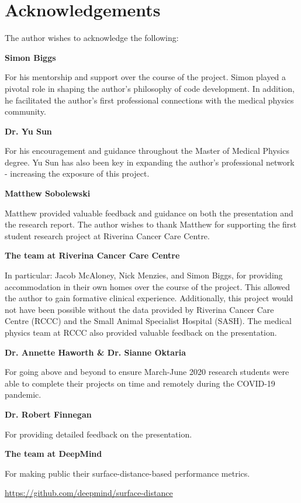 \chapter{Acknowledgements}
\label{ch:acknowledgements}

The author wishes to acknowledge the following:

\textbf{Simon Biggs}

For his mentorship and support over the course of the project. Simon played a pivotal role
in shaping the author's philosophy of code development. In addition, he facilitated the
author's first professional connections with the medical physics community.

\textbf{Dr. Yu Sun}

For his encouragement and guidance throughout the Master of Medical Physics degree. Yu Sun has also been key in expanding the author's professional network - increasing the exposure of this project.

\textbf{Matthew Sobolewski}

Matthew provided valuable feedback and guidance on both the presentation and the research report. The author wishes to thank Matthew for supporting the first student research project at Riverina Cancer Care Centre.

\textbf{The team at Riverina Cancer Care Centre}

In particular: Jacob McAloney, Nick Menzies, and
Simon Biggs, for providing accommodation in their own homes over the course of
the project. This allowed the author to gain formative clinical experience. Additionally, this project would not have been possible without the data provided by Riverina Cancer Care Centre (RCCC) and the Small Animal Specialist Hospital (SASH). The medical physics team at RCCC also provided valuable feedback on the presentation.


\textbf{Dr. Annette Haworth \& Dr. Sianne Oktaria}

For going above and beyond to ensure March-\todo{--}June 2020 research students were able to complete their projects on time and remotely during the COVID-19 pandemic.

\textbf{Dr. Robert Finnegan}

For providing detailed feedback on the presentation.

\textbf{The team at DeepMind}

For making public their surface-distance-based performance metrics.

\url{https://github.com/deepmind/surface-distance}
